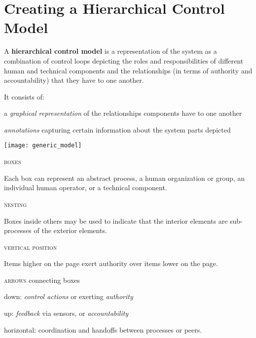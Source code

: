 \documentclass[letterpaper]{tufte-book}
\begin{document}
\setlength{\parindent}{0em}
\setlength{\parskip}{.75em}

\section{Creating a Hierarchical Control Model}


A \textbf{hierarchical control model} is a representation of the system as a combination of control loops depicting the roles and responsibilities of different human and technical components and the relationships (in terms of authority and accountability) that they have to one another.

It consists of:
\begin{compactitem}
\setlength{\itemsep}{0pt}
\setlength{\parskip}{.25em}
\item a \emph{graphical representation} of the relationships components have to one another
%
\item \emph{annotations} capturing certain information about the system parts depicted
\end{compactitem}

\begin{center}
\texttt{[image: generic\_model]}
\end{center}


\begin{compactitem}
 \setlength{\itemsep}{0pt}
\setlength{\parskip}{.25em}
 \item \textsc{boxes}
 
 Each box can represent an abstract process, a human organization or group, an individual human operator, or a technical component.
 \item \textsc{nesting}
 
 Boxes inside others may be used to indicate that the interior elements are sub-processes of the exterior elements.
 \item \textsc{vertical position} 
 
 Items higher on the page exert authority over items lower on the page. 
\item \textsc{arrows} connecting boxes
\begin{compactitem}
		 \setlength{\itemsep}{0pt}
		\setlength{\parskip}{.25em}
		\item down: \emph{control actions} or exerting \emph{authority}
		\item up: \emph{feedback} via sensors, or \emph{accountability}
		\item horizontal: coordination and handoffs between \hbox{processes} or peers.
	\end{compactitem}
 \end{compactitem}
 
\end{document}
